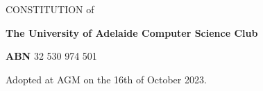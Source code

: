 \begin{titlepage}
   \begin{center}

       \vspace{1cm}
        \LARGE CONSTITUTION of
            
       \vspace{0.3cm}

       \huge\textbf{The University of Adelaide Computer Science Club}
       
       \vspace{0.2cm}
       \Large\textbf{ABN} 32 530 974 501
       
       \vfill
       
       

       \vfill
            
            
     
        
       Adopted at AGM on the 16th of October 2023.
       
            
   \end{center}
\end{titlepage}
